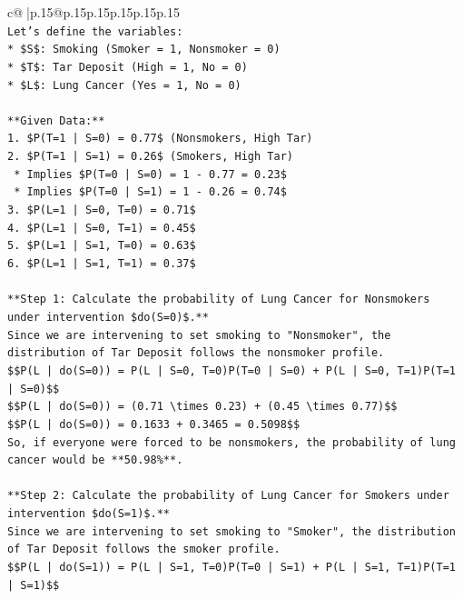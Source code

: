 \documentclass{article}
\begin{document}
{\begin{supertabular}{c@{$\;$}|p{.15\linewidth}@{}p{.15\linewidth}p{.15\linewidth}p{.15\linewidth}p{.15\linewidth}p{.15\linewidth}}
{{{\\ 
\texttt{Let's define the variables:} \\
\texttt{*   \$S\$: Smoking (Smoker = 1, Nonsmoker = 0)} \\
\texttt{*   \$T\$: Tar Deposit (High = 1, No = 0)} \\
\texttt{*   \$L\$: Lung Cancer (Yes = 1, No = 0)} \\
\\ 
\texttt{**Given Data:**} \\
\texttt{1.  \$P(T=1 | S=0) = 0.77\$ (Nonsmokers, High Tar)} \\
\texttt{2.  \$P(T=1 | S=1) = 0.26\$ (Smokers, High Tar)} \\
\texttt{    *   Implies \$P(T=0 | S=0) = 1 {-} 0.77 = 0.23\$} \\
\texttt{    *   Implies \$P(T=0 | S=1) = 1 {-} 0.26 = 0.74\$} \\
\texttt{3.  \$P(L=1 | S=0, T=0) = 0.71\$} \\
\texttt{4.  \$P(L=1 | S=0, T=1) = 0.45\$} \\
\texttt{5.  \$P(L=1 | S=1, T=0) = 0.63\$} \\
\texttt{6.  \$P(L=1 | S=1, T=1) = 0.37\$} \\
\\ 
\texttt{**Step 1: Calculate the probability of Lung Cancer for Nonsmokers under intervention \$do(S=0)\$.**} \\
\texttt{Since we are intervening to set smoking to "Nonsmoker", the distribution of Tar Deposit follows the nonsmoker profile.} \\
\texttt{\$\$P(L | do(S=0)) = P(L | S=0, T=0)P(T=0 | S=0) + P(L | S=0, T=1)P(T=1 | S=0)\$\$} \\
\texttt{\$\$P(L | do(S=0)) = (0.71 \textbackslash{}times 0.23) + (0.45 \textbackslash{}times 0.77)\$\$} \\
\texttt{\$\$P(L | do(S=0)) = 0.1633 + 0.3465 = 0.5098\$\$} \\
\texttt{So, if everyone were forced to be nonsmokers, the probability of lung cancer would be **50.98\%**.} \\
\\ 
\texttt{**Step 2: Calculate the probability of Lung Cancer for Smokers under intervention \$do(S=1)\$.**} \\
\texttt{Since we are intervening to set smoking to "Smoker", the distribution of Tar Deposit follows the smoker profile.} \\
\texttt{\$\$P(L | do(S=1)) = P(L | S=1, T=0)P(T=0 | S=1) + P(L | S=1, T=1)P(T=1 | S=1)\$\$} \\
}}}
\end{supertabular}}
\end{document}
